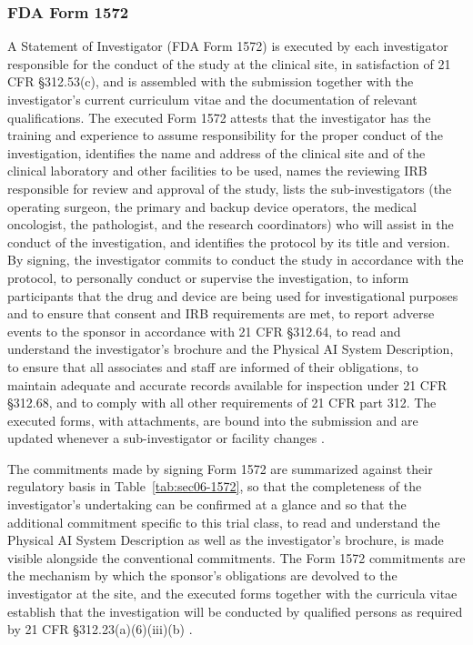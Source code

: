 \subsubsection{FDA Form 1572}

A Statement of Investigator (FDA Form 1572) is executed by each investigator
responsible for the conduct of the study at the clinical site, in satisfaction of
21 CFR \S 312.53(c), and is assembled with the submission together with the
investigator's current curriculum vitae and the documentation of relevant
qualifications. The executed Form 1572 attests that the investigator has the
training and experience to assume responsibility for the proper conduct of the
investigation, identifies the name and address of the clinical site and of the
clinical laboratory and other facilities to be used, names the reviewing IRB
responsible for review and approval of the study, lists the sub-investigators (the
operating surgeon, the primary and backup device operators, the medical oncologist,
the pathologist, and the research coordinators) who will assist in the conduct of
the investigation, and identifies the protocol by its title and version. By signing,
the investigator commits to conduct the study in accordance with the protocol, to
personally conduct or supervise the investigation, to inform participants that the
drug and device are being used for investigational purposes and to ensure that
consent and IRB requirements are met, to report adverse events to the sponsor in
accordance with 21 CFR \S 312.64, to read and understand the investigator's brochure
and the Physical AI System Description, to ensure that all associates and staff are
informed of their obligations, to maintain adequate and accurate records available
for inspection under 21 CFR \S 312.68, and to comply with all other requirements of
21 CFR part 312. The executed forms, with attachments, are bound into the submission
and are updated whenever a sub-investigator or facility changes \cite{phase1guidance}.

The commitments made by signing Form 1572 are summarized against their regulatory
basis in Table~\ref{tab:sec06-1572}, so that the completeness of the investigator's
undertaking can be confirmed at a glance and so that the additional commitment
specific to this trial class, to read and understand the Physical AI System
Description as well as the investigator's brochure, is made visible alongside the
conventional commitments. The Form 1572 commitments are the mechanism by which the
sponsor's obligations are devolved to the investigator at the site, and the executed
forms together with the curricula vitae establish that the investigation will be
conducted by qualified persons as required by 21 CFR \S 312.23(a)(6)(iii)(b)
\cite{phase1guidance,paisitedocpk}.

